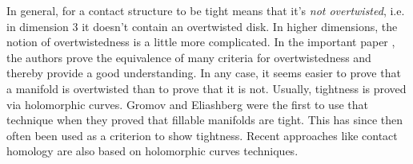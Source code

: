 In general, for a contact structure to be tight means that it's \textit{not overtwisted}, i.e. in dimension 3 it doesn't contain an overtwisted disk.
In higher dimensions, the notion of overtwistedness is a little more complicated. In the important paper \cite{CMP19}, the authors prove the equivalence 
of many criteria for overtwistedness and thereby provide a good understanding. In any case, it seems easier to prove that a manifold is overtwisted than
to prove that it is not.
Usually, tightness is proved via holomorphic curves. Gromov and Eliashberg were the first to use that technique \cite{Gromov85,Eliashberg91}
when they proved that fillable manifolds are tight. This has since then often been used as a criterion to show tightness.
Recent approaches like contact homology are also based on holomorphic curves techniques.

